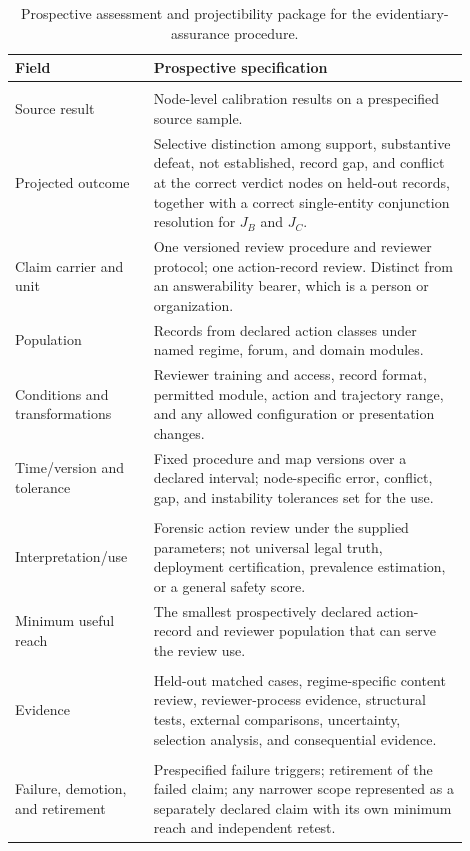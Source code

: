 \begin{table}[!t]
\footnotesize
\centering
\begin{tabular}{>{\raggedright\arraybackslash}p{0.27\linewidth}%
                >{\raggedright\arraybackslash}p{0.63\linewidth}}
\toprule
Field & Prospective specification \\
\midrule
\multicolumn{2}{l}{\textit{Projective declaration}} \\
Source result & Node-level calibration results on a prespecified source sample. \\
Projected outcome & Selective distinction among support, substantive defeat, not established, record gap, and conflict at the correct verdict nodes on held-out records, together with a correct single-entity conjunction resolution for \(J_B\) and \(J_C\). \\
Claim carrier and unit & One versioned review procedure and reviewer protocol; one action-record review. Distinct from an answerability bearer, which is a person or organization. \\
Population & Records from declared action classes under named regime, forum, and domain modules. \\
Conditions and transformations & Reviewer training and access, record format, permitted module, action and trajectory range, and any allowed configuration or presentation changes. \\
Time/version and tolerance & Fixed procedure and map versions over a declared interval; node-specific error, conflict, gap, and instability tolerances set for the use. \\
\addlinespace
\multicolumn{2}{l}{\textit{Inquiry and use}} \\
Interpretation/use & Forensic action review under the supplied parameters; not universal legal truth, deployment certification, prevalence estimation, or a general safety score. \\
Minimum useful reach & The smallest prospectively declared action-record and reviewer population that can serve the review use. \\
\addlinespace
\multicolumn{2}{l}{\textit{Warrant plan}} \\
Evidence & Held-out matched cases, regime-specific content review, reviewer-process evidence, structural tests, external comparisons, uncertainty, selection analysis, and consequential evidence. \\
\addlinespace
\multicolumn{2}{l}{\textit{Revision rule}} \\
Failure, demotion, and retirement & Prespecified failure triggers; retirement of the failed claim; any narrower scope represented as a separately declared claim with its own minimum reach and independent retest. \\
\bottomrule
\end{tabular}
\caption{Prospective assessment and projectibility package for the evidentiary-assurance procedure.}
\label{tab:ea-validation-package}
\end{table}


